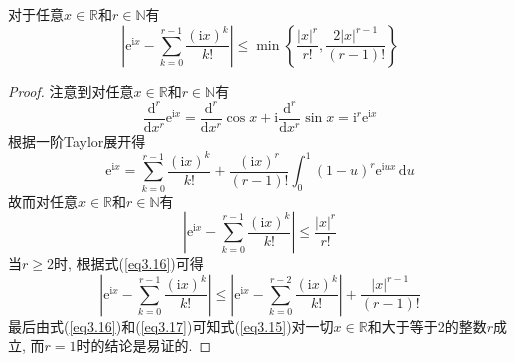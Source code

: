 \documentclass[cn, 12pt, math=mtpro2, bibstyle=apa, blue, twocol]{elegantbook}
\newcommand{\R}{\mathbb{R}}
\begin{document}
\begin{lemma}\label{lem:lem3.1}
对于任意$x\in\R$和$r\in\mathbb{N}$有
\begin{equation}\label{eq3.15}
  \left|\text{e}^{\text{i}x}-\sum_{k=0}^{r-1}\frac{(\text{i}x)^k}{k!}\right|\leq\min\left\{\frac{|x|^r}{r!},\frac{2|x|^{r-1}}{(r-1)!}\right\}
\end{equation}
\end{lemma}
\begin{proof}
  注意到对任意$x\in\R$和$r\in\mathbb{N}$有
  $$\frac{\text{d}^r}{\text{d}x^r}\text{e}^{\text{i}x}=\frac{\text{d}^r}{\text{d}x^r}\cos x+\text{i}\frac{\text{d}^r}{\text{d}x^r}\sin x=\text{i}^r\text{e}^{\text{i}x}$$
  根据一阶Taylor展开得
  $$\text{e}^{\text{i}x}=\sum_{k=0}^{r-1}\frac{(\text{i}x)^k}{k!}+\frac{(\text{i}x)^r}{(r-1)!}\int_{0}^{1}(1-u)^r\text{e}^{\text{i}ux}\,\text{d}u$$
  故而对任意$x\in\R$和$r\in\mathbb{N}$有
  \begin{equation}\label{eq3.16}
    \left|\text{e}^{\text{i}x}-\sum_{k=0}^{r-1}\frac{(\text{i}x)^k}{k!}\right|\leq\frac{|x|^r}{r!}
  \end{equation}
  当$r\ge2$时, 根据式(\ref{eq3.16})可得
  \begin{equation}\label{eq3.17}
    \left|\text{e}^{\text{i}x}-\sum_{k=0}^{r-1}\frac{(\text{i}x)^k}{k!}\right|\leq \left|\text{e}^{\text{i}x}-\sum_{k=0}^{r-2}\frac{(\text{i}x)^k}{k!}\right|+\frac{|x|^{r-1}}{(r-1)!}
  \end{equation}
  最后由式(\ref{eq3.16})和(\ref{eq3.17})可知式(\ref{eq3.15})对一切$x\in\R$和大于等于2的整数$r$成立, 而$r=1$时的结论是易证的.
\end{proof}
\end{document}
